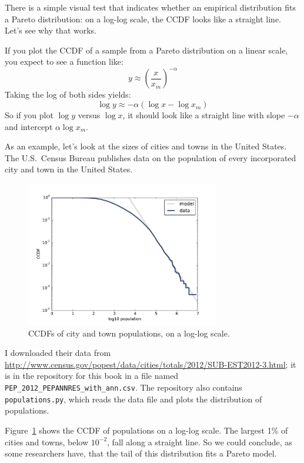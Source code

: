 \documentclass[12pt]{book}
\begin{document}
There is a simple visual test that indicates whether an empirical
distribution fits a Pareto distribution: on a log-log scale, the CCDF
looks like a straight line.  Let's see why that works.

If you plot the CCDF of a sample from a Pareto distribution on a
linear scale, you expect to see a function like:
%
\[ y \approx \left( \frac{x}{x_m} \right) ^{-\alpha} \]
%
Taking the log of both sides yields:
%
\[ \log y \approx -\alpha (\log x - \log x_{m})\]
%
So if you plot $\log y$ versus $\log x$, it should look like a straight
line with slope $-\alpha$ and intercept
$\alpha \log x_{m}$.

As an example, let's look at the sizes of cities and towns in the
United States.  The U.S.~Census Bureau publishes data on the
population of every incorporated city and town in the United States.
 
  

\begin{figure}
\centerline{\includegraphics[height=2.5in]{figs/populations_pareto.pdf}}
\caption{CCDFs of city and town populations, on a log-log scale.}
\label{populations_pareto}
\end{figure}

I downloaded their data from
\url{http://www.census.gov/popest/data/cities/totals/2012/SUB-EST2012-3.html};
it is in the repository for this book in a file named
\verb"PEP_2012_PEPANNRES_with_ann.csv".  The repository also
contains {\tt populations.py}, which reads the data file and plots
the distribution of populations.

Figure~\ref{populations_pareto} shows the CCDF of populations on a
log-log scale.  The largest 1\% of cities and towns, below $10^{-2}$,
fall along a straight line.  So we could
conclude, as some researchers have, that the tail of this distribution
fits a Pareto model.
\end{document}
